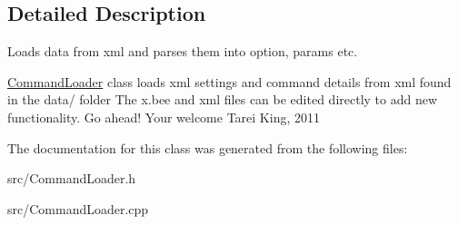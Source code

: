 \subsection{Detailed Description}
Loads data from xml and parses them into option, params etc. 

\hyperlink{class_command_loader}{CommandLoader} class loads xml settings and command details from xml found in the data/ folder The x.bee and xml files can be edited directly to add new functionality. Go ahead! Your welcome Tarei King, 2011 

The documentation for this class was generated from the following files:\begin{DoxyCompactItemize}
\item 
src/CommandLoader.h\item 
src/CommandLoader.cpp\end{DoxyCompactItemize}
